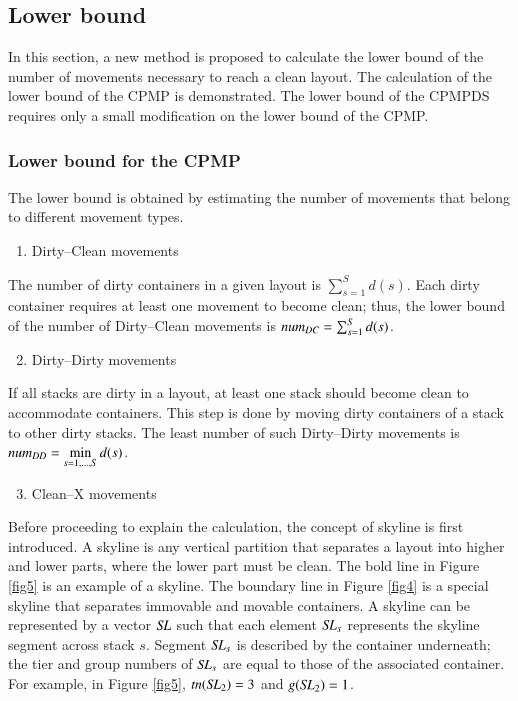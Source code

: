 \documentclass[review,3p,times,authoryear,12pt]{elsarticle}
\begin{document}
\subsection{Lower bound}

In this section, a new method is proposed to calculate the lower bound of the number of movements necessary to reach a clean layout. The calculation of the lower bound of the CPMP is demonstrated. The lower bound of the CPMPDS requires only a small modification on the lower bound of the CPMP.

\subsubsection{Lower bound for the CPMP}

The lower bound is obtained by estimating the number of movements that belong to different movement types.
\begin{enumerate}
\setcounter{enumi}{0}
\item Dirty--Clean movements
\end{enumerate}

The number of dirty containers in a given layout is $\sum_{s=1}^S d(s)$. Each dirty container requires at least one movement to become clean; thus, the lower bound of the number of Dirty--Clean movements is $\id{num}_\id{DC}=\sum_{s=1}^S d(s)$.

\begin{enumerate}
\setcounter{enumi}{1}
\item Dirty--Dirty movements
\end{enumerate}

If all stacks are dirty in a layout, at least one stack should become clean to accommodate containers. This step is done by moving dirty containers of a stack to other dirty stacks. The least number of such Dirty--Dirty movements is $\id{num}_\id{DD} = \min\limits_{s=1, \dots, S} d(s)$.

\begin{enumerate}
\setcounter{enumi}{2}
\item Clean--X movements
\end{enumerate}

Before proceeding to explain the calculation, the concept of skyline is first introduced. A skyline is any vertical partition that separates a layout into higher and lower parts, where the lower part must be clean. The bold line in Figure \ref{fig5} is an example of a skyline. The boundary line in Figure \ref{fig4} is a special skyline that separates immovable and movable containers. A skyline can be represented by a vector $\id{SL}$ such that each element $\id{SL}_s$ represents the skyline segment across stack $s$. Segment $\id{SL}_s$ is described by the container underneath; the tier and group numbers of $\id{SL}_s$ are equal to those of the associated container. For example, in Figure \ref{fig5}, $\id{tn}(\id{SL}_{2})=3$ and $g(\id{SL}_{2})=1$.
\end{document}
